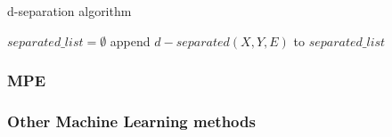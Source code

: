 \begin{algorithm}[htp!]
	\caption{d-separation algorithm}
	\label{alg:d-separation}
	\begin{algorithmic}[1]
		\State $separated\_list = \emptyset$
			\State append $d-separated(X, Y, E)$ to $separated\_list$ 
		\EndFor
	\end{algorithmic}
\end{algorithm}

\subsubsection{MPE}

\subsubsection{Other Machine Learning methods}


